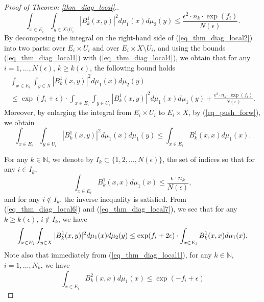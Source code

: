 \documentclass[12pt]{article}
\numberwithin{equation}{section}
\theoremstyle{theorem}
\theoremstyle{definition}
\theoremstyle{remark}
\newcommand{\nat}{\mathbb{N}}
\begin{document}
\begin{proof}[Proof of Theorem \ref{thm_diag_local}.]
\begin{equation}
			\int_{x \in E_i} \int_{y \in X \setminus U_i} |B^1_k(x, y)|^2 d \mu_1(x) d \mu_2(y)
			\leq
			\frac{\epsilon^2 \cdot n_k \cdot \exp(f_i)}{N(\epsilon)}.
		\end{equation}
		By decomposing the integral on the right-hand side of (\ref{eq_thm_diag_local2}) into two parts: over $E_i \times U_i$ and over $E_i \times X \setminus U_i$, and using the bounds (\ref{eq_thm_diag_local1}) with (\ref{eq_thm_diag_local4}), we obtain that for any $i = 1, \ldots, N(\epsilon)$, $k \geq k(\epsilon)$, the following bound holds
		\begin{multline}\label{eq_thm_diag_local6}
			\int_{x \in E_i} \int_{y \in X} |B^1_k(x, y)|^2 d \mu_1(x) d \mu_2(y)
			\\
			\leq
			\exp(f_i + \epsilon)
			\cdot
			\int_{x \in E_i} \int_{y \in U_i} |B^1_k(x, y)|^2 d \mu_1(x) d \mu_1(y)
			+
			\frac{\epsilon^2 \cdot n_k \cdot \exp(f_i)}{N(\epsilon)}.
		\end{multline}
		Moreover, by enlarging the integral from $E_i \times U_i$ to $E_i \times X$, by (\ref{eq_push_forw}), we obtain
		\begin{equation}\label{eq_thm_diag_local7}
			\int_{x \in E_i} \int_{y \in U_i} |B^1_k(x, y)|^2 d \mu_1(x) d \mu_1(y)
			\leq
			\int_{x \in E_i} B^1_k(x, x) d \mu_1(x).
		\end{equation}
		\par 
		For any $k \in \nat$, we denote by $I_k \subset \{1, 2, \ldots, N(\epsilon) \}$, the set of indices so that for any $i \in I_k$,
		\begin{equation}\label{eq_thm_diag_local5}
			\int_{x \in E_i} B^1_k(x, x)  d \mu_1(x)
			\leq
			\frac{\epsilon \cdot n_k}{N(\epsilon)},
		\end{equation}
		and for any $i \notin I_k$, the inverse inequality is satisfied.
		From (\ref{eq_thm_diag_local6}) and (\ref{eq_thm_diag_local7}), we see that for any $k \geq k(\epsilon)$, $i \notin I_k$, we have
		\begin{equation}\label{eq_thm_diag_local77}
			\int_{x \in E_i} \int_{y \in X} |B^1_k(x, y)|^2 d \mu_1(x) d \mu_2(y)
			\\
			\leq
			\exp(f_i + 2 \epsilon) \cdot \int_{x \in E_i} B^1_k(x, x) d \mu_1(x).
		\end{equation}
		Note also that immediately from (\ref{eq_thm_diag_local1}), for any $k \in \nat$, $i = 1, \ldots, N_k$, we have
		\begin{equation}\label{eq_thm_diag_local8}
			\int_{x \in E_i} B^2_k(x, x)  d \mu_1(x)
			\leq
			\exp(- f_i + \epsilon)

\end{equation}
\end{proof}
\end{document}
